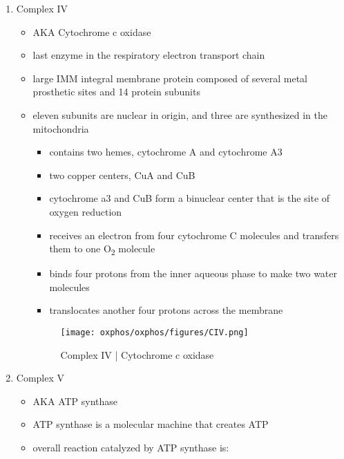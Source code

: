\documentclass{scrartcl}
\begin{document}
\begin{enumerate}
\begin{itemize}
{\small{}}
\end{itemize}

\item Complex IV
\label{sec:org2de70b3}
\begin{itemize}
\item AKA Cytochrome c oxidase
\item last enzyme in the respiratory electron transport chain
\item large IMM integral membrane protein composed of several metal prosthetic sites and 14 protein subunits
\item eleven subunits are nuclear in origin, and three are synthesized in the mitochondria
\begin{itemize}
\item contains two hemes, cytochrome A and cytochrome A3
\item two copper centers, CuA and CuB
\item cytochrome a3 and CuB form a binuclear center that is the site of
oxygen reduction
\item receives an electron from four cytochrome C molecules and
transfers them to one O\textsubscript{2} molecule
\end{itemize}

{\small{}}

\begin{itemize}
\item binds four protons from the inner aqueous phase to make two water
molecules
\item translocates another four protons across the membrane
\end{itemize}

\begin{figure}[htbp]
\centering
\texttt{[image: oxphos/oxphos/figures/CIV.png]}
\caption[cIV]{\label{fig:org3eb5067}Complex IV | Cytochrome c oxidase}
\end{figure}
\end{itemize}

\item Complex V
\label{sec:orgb7530f3}
\begin{itemize}
\item AKA ATP synthase
\item ATP synthase is a molecular machine that creates ATP
\item overall reaction catalyzed by ATP synthase is:
\end{itemize}


\end{enumerate}
\end{document}
